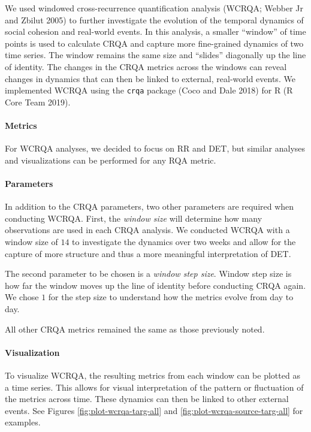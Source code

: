 \documentclass[english,man]{apa6}
\begin{document}
We used windowed cross-recurrence quantification analysis (WCRQA; Webber Jr and Zbilut 2005) to further investigate the evolution of the temporal
dynamics of social cohesion and real-world events. In this analysis, a smaller
\enquote{window} of time points is used to calculate CRQA and capture more fine-grained
dynamics of two time series. The window remains the same size and \enquote{slides}
diagonally up the line of identity. The changes in the CRQA metrics across the
windows can reveal changes in dynamics that can then be linked to external,
real-world events. We implemented WCRQA using the \texttt{crqa} package (Coco and Dale 2018) for R
(R Core Team 2019).

\hypertarget{metrics-1}{%
\paragraph{Metrics}\label{metrics-1}}

For WCRQA analyses, we decided to focus on RR and DET, but similar analyses and
visualizations can be performed for any RQA metric.

\hypertarget{parameters-1}{%
\paragraph{Parameters}\label{parameters-1}}

In addition to the CRQA parameters, two other parameters are required when
conducting WCRQA. First, the \emph{window size} will determine how many observations
are used in each CRQA analysis. We conducted WCRQA with a window size of \(14\) to
investigate the dynamics over two weeks and allow for the capture of more
structure and thus a more meaningful interpretation of DET.

The second parameter to be chosen is a \emph{window step size}. Window step size is
how far the window moves up the line of identity before conducting CRQA again.
We chose \(1\) for the step size to understand how the metrics evolve from day to
day.

All other CRQA metrics remained the same as those previously noted.

\hypertarget{visualization-1}{%
\paragraph{Visualization}\label{visualization-1}}

To visualize WCRQA, the resulting metrics from each window can be plotted as a
time series. This allows for visual interpretation of the pattern or fluctuation
of the metrics across time. These dynamics can then be linked to other external
events. See Figures \ref{fig:plot-wcrqa-targ-all} and
\ref{fig:plot-wcrqa-source-targ-all} for examples.
\end{document}
